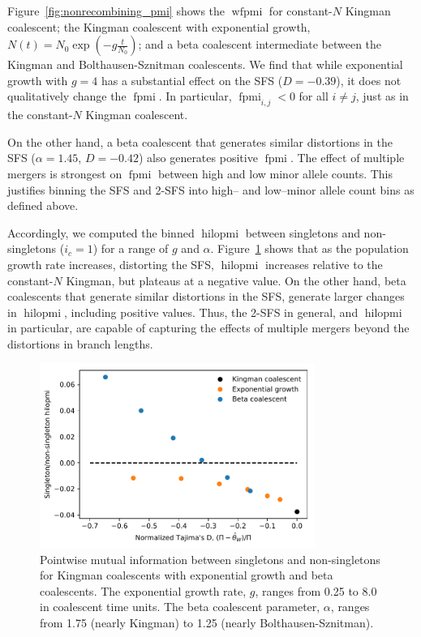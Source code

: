 \documentclass[11pt, letterpaper]{article}   	%
\newcommand{\Fig}[1]{Figure~\ref{#1}}
\DeclareMathOperator{\fpmi}{fpmi}
\DeclareMathOperator{\wfpmi}{wfpmi}
\DeclareMathOperator{\hilopmi}{hilopmi}
\begin{document}
\Fig{fig:nonrecombining_pmi} shows the $\wfpmi$ for constant-$N$ Kingman coalescent; the Kingman coalescent with exponential growth, $N(t)=N_0 \exp(-g \frac{t}{N_0})$; and a beta coalescent intermediate between the Kingman and Bolthausen-Sznitman coalescents.
We find that while exponential growth with $g=4$ has a substantial effect on the SFS ($D = -0.39$), it does not qualitatively change the $\fpmi$.
In particular, $\fpmi_{i,j} < 0$ for all $i \neq j$, just as in the constant-$N$ Kingman coalescent.

On the other hand, a beta coalescent that generates similar distortions in the SFS ($\alpha=1.45$, $D = -0.42$) also generates positive $\fpmi$.
The effect of multiple mergers is strongest on $\fpmi$ between high and low minor allele counts.
This justifies binning the SFS and 2-SFS into high-- and low--minor allele count bins as defined above.

Accordingly, we computed the binned $\hilopmi$ between singletons and non-singletons ($i_c = 1$) for a range of $g$ and $\alpha$.
\Fig{fig:fpmi_vs_tajimasd} shows that as the population growth rate increases, distorting the SFS, $\hilopmi$ increases relative to the constant-$N$ Kingman, but plateaus at a negative value.
On the other hand, beta coalescents that generate similar distortions in the SFS, generate larger changes in $\hilopmi$, including positive values.
Thus, the 2-SFS in general, and $\hilopmi$ in particular, are capable of capturing the effects of multiple mergers beyond the distortions in branch lengths.

\begin{figure}
\centering
\includegraphics[width=0.8\textwidth]{figures/hilopmi_vs_tajimasD_no_recombination.pdf}
\caption{Pointwise mutual information between singletons and non-singletons for Kingman coalescents with exponential growth and beta coalescents. The exponential growth rate, $g$, ranges from 0.25 to 8.0 in coalescent time units. The beta coalescent parameter, $\alpha$, ranges from 1.75 (nearly Kingman) to 1.25 (nearly Bolthausen-Sznitman). \label{fig:fpmi_vs_tajimasd}}
\end{figure}
\end{document}

